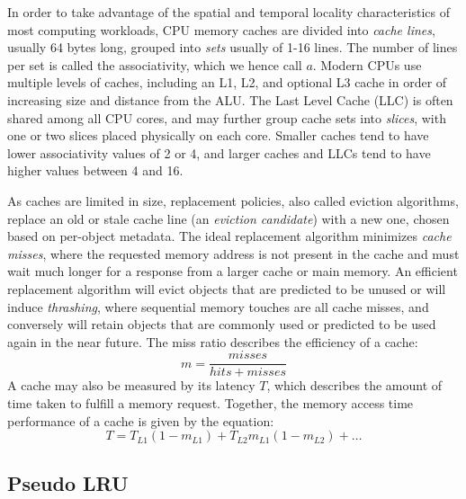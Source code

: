 \documentclass[letterpaper, twocolumn]{article}
\begin{document}
In order to take advantage of the spatial and temporal locality characteristics
of most computing workloads,
CPU memory caches are divided into \textit{cache lines}, usually 64 bytes long,
grouped into \textit{sets} usually of 1-16 lines.
The number of lines per set is called the associativity, which we hence call $a$.
Modern CPUs use multiple levels of caches, including an L1, L2, and optional L3 cache
in order of increasing size and distance from the ALU.
The Last Level Cache (LLC) is often shared among all CPU cores, and may further group
cache sets into \textit{slices}, with one or two slices placed physically on each core.
Smaller caches tend to have lower associativity values of 2 or 4, and larger caches and LLCs
tend to have higher values between 4 and 16.

As caches are limited in size, replacement policies, also called eviction algorithms,
replace an old or stale cache line (an \textit{eviction candidate}) with a new one,
chosen based on per-object metadata.
The ideal replacement algorithm minimizes \textit{cache misses}, where the requested memory address
is not present in the cache and must wait much longer for a response
from a larger cache or main memory.
An efficient replacement algorithm will evict objects that are predicted to be unused
or will induce \textit{thrashing}, where sequential memory touches are all cache misses,
and conversely will retain objects that are commonly used
or predicted to be used again in the near future.
The miss ratio describes the efficiency of a cache:
\begin{equation}
  m = \frac{misses}{hits + misses}
\end{equation}
A cache may also be measured by its latency $T$, which describes the amount of time taken
to fulfill a memory request.
Together, the memory access time performance of a cache is given by the equation:
\begin{equation}
  T = T_{L1}(1-m_{L1}) + T_{L2}m_{L1}(1-m_{L2}) + \dots
\end{equation}

\subsection{Pseudo LRU}
\end{document}
